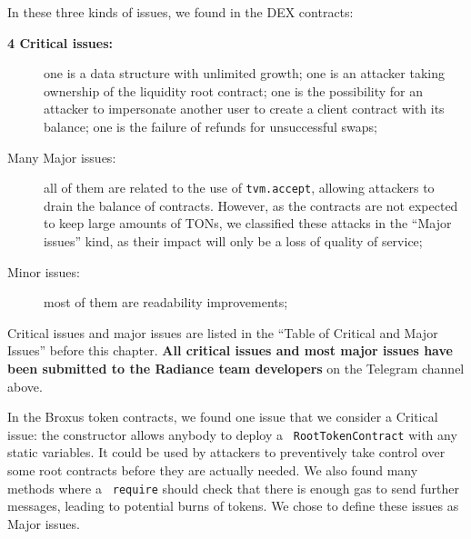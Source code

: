 In these three kinds of issues, we found in the DEX contracts:
\begin{description}

\item[{\bf 4 Critical issues:}] one is a data structure with unlimited growth; one is an attacker taking ownership of the liquidity root contract; one is the possibility for an attacker to impersonate another user to create a client contract with its balance; one is the failure of refunds for unsuccessful swaps;

\item[Many Major issues:] all of them are related to the use of {\tt tvm.accept}, allowing attackers to drain the balance of contracts. However, as the contracts are not expected to keep large amounts of TONs, we classified these attacks in the ``Major issues'' kind, as their impact will only be a loss of quality of service;

\item[Minor issues:] most of them are readability improvements;
\end{description}

Critical issues and major issues are listed in the ``Table of Critical
and Major Issues'' before this chapter. {\bf All critical issues and
most major issues have been submitted to the Radiance team developers}
on the Telegram channel above.

In the Broxus token contracts, we found one issue that we consider a
Critical issue: the constructor allows anybody to deploy a {\tt
RootTokenContract} with any static variables. It could be used by
attackers to preventively take control over some root contracts before
they are actually needed.  We also found many methods where a {\tt
require} should check that there is enough gas to send further
messages, leading to potential burns of tokens. We chose to define
these issues as Major issues.

